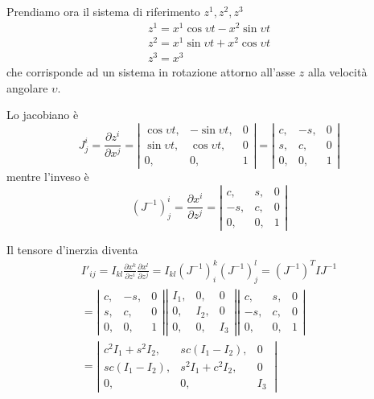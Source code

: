 \documentclass[a4paper,11pt]{article}
\begin{document}
Prendiamo ora il sistema di riferimento $ z^1, z^2, z^3 $
\begin{eqnarray*}
	z^1 = x^1 \cos \upsilon t - x^2 \sin \upsilon t
\\
	z^2 = x^1 \sin \upsilon t + x^2 \cos \upsilon t
\\	
	z^3 = x^3
\end{eqnarray*} che corrisponde ad un sistema in rotazione attorno all'asse $z$ alla velocità angolare $ \upsilon $.

Lo jacobiano è
\[
	J^i_j = \frac{\partial z^i}{\partial x^j} = 
\left|
\begin{array}{lll}
	\cos \upsilon t, & -\sin \upsilon t, & 0
\\
	\sin \upsilon t, & \cos \upsilon t, & 0
\\
	0, & 0, & 1
\end{array}
\right|
	=
\left|
\begin{array}{lll}
	c, & -s, & 0
\\
	s, & c, & 0
\\
	0, & 0, & 1
\end{array}
\right|
\]
mentre l'inveso è 
\[
	(J^{-1})^i_j = \frac{\partial x^i}{\partial z^j} = 
\left|
\begin{array}{lll}
	c, & s, & 0
\\
	-s, & c, & 0
\\
	0, & 0, & 1
\end{array}
\right|
\]

Il tensore d'inerzia diventa
\begin{eqnarray*}
	I'_{ij} = I_{kl} \frac{\partial x^k}{\partial z^i} \frac{\partial x^l}{\partial z^j}
	= I_{kl} (J^{-1})^k_i (J^{-1})^l_j = (J^{-1})^T I J^{-1}
\\
	= \left|
\begin{array}{lll}
	c, & -s, & 0
\\
	s, & c, & 0
\\
	0, & 0, & 1
\end{array}
	\right|
	\left|
\begin{array}{lll}
	I_1, & 0, & 0
\\
	0, & I_2, & 0
\\
	0, & 0, & I_3
\end{array}
	\right|
	\left|
\begin{array}{lll}
	c, & s, & 0
\\
	-s, & c, & 0
\\
	0, & 0, & 1
\end{array}
\right|
\\
=
	\left|
\begin{array}{lll}
	c^2 I_1 + s^2 I_2, & sc (I_1 - I_2), & 0
\\
	sc (I_1 - I_2), &s^2 I_1 + c^2 I_2 , & 0
\\
	0, & 0, & I_3
\end{array}\
\right|
\end{eqnarray*}
\end{document}
